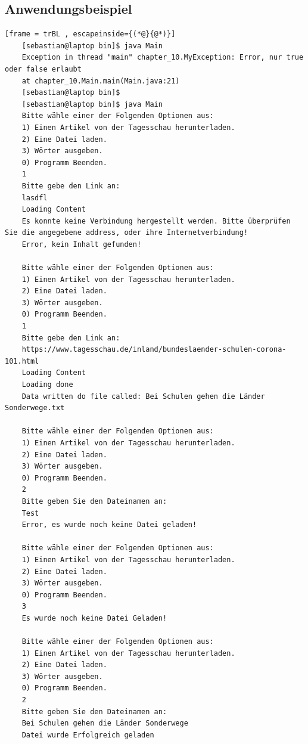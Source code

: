 \subsection{Anwendungsbeispiel}
\begin{lstlisting}[frame = trBL , escapeinside={(*@}{@*)}]
	[sebastian@laptop bin]$ java Main 	
	Exception in thread "main" chapter_10.MyException: Error, nur true oder false erlaubt
	at chapter_10.Main.main(Main.java:21)
	[sebastian@laptop bin]$ 
	[sebastian@laptop bin]$ java Main 
	Bitte wähle einer der Folgenden Optionen aus:
	1) Einen Artikel von der Tagesschau herunterladen.
	2) Eine Datei laden.
	3) Wörter ausgeben.
	0) Programm Beenden.
	1
	Bitte gebe den Link an:
	lasdfl
	Loading Content
	Es konnte keine Verbindung hergestellt werden. Bitte überprüfen Sie die angegebene address, oder ihre Internetverbindung!
	Error, kein Inhalt gefunden!
	
	Bitte wähle einer der Folgenden Optionen aus:
	1) Einen Artikel von der Tagesschau herunterladen.
	2) Eine Datei laden.
	3) Wörter ausgeben.
	0) Programm Beenden.
	1
	Bitte gebe den Link an:
	https://www.tagesschau.de/inland/bundeslaender-schulen-corona-101.html
	Loading Content
	Loading done
	Data written do file called: Bei Schulen gehen die Länder Sonderwege.txt
	
	Bitte wähle einer der Folgenden Optionen aus:
	1) Einen Artikel von der Tagesschau herunterladen.
	2) Eine Datei laden.
	3) Wörter ausgeben.
	0) Programm Beenden.
	2
	Bitte geben Sie den Dateinamen an:
	Test
	Error, es wurde noch keine Datei geladen!
	
	Bitte wähle einer der Folgenden Optionen aus:
	1) Einen Artikel von der Tagesschau herunterladen.
	2) Eine Datei laden.
	3) Wörter ausgeben.
	0) Programm Beenden.
	3
	Es wurde noch keine Datei Geladen!
	
	Bitte wähle einer der Folgenden Optionen aus:
	1) Einen Artikel von der Tagesschau herunterladen.
	2) Eine Datei laden.
	3) Wörter ausgeben.
	0) Programm Beenden.
	2
	Bitte geben Sie den Dateinamen an:
	Bei Schulen gehen die Länder Sonderwege
	Datei wurde Erfolgreich geladen
	

\end{lstlisting}
